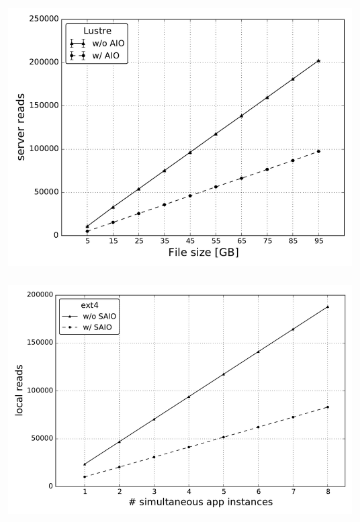 \begin{figure}[!htb]
\begin{subfigure}[t]{0.32\textwidth}
    \centering
    \includegraphics[width=\textwidth]{figures/SC2015/ROOT/separate_plots/test_cluster/Lustre/server_reads}
    \caption{\textit{}}
    \label{figure: lustre_3}
  \end{subfigure}
  \begin{subfigure}[b]{0.32\textwidth}
    \centering
    \includegraphics[width=\textwidth]{figures/SC2015/ROOT/cluster/multiple_instances/reads_simult_instance_ext4_test_cluster}
    \caption{\textit{}}
    \label{figure: ext4_4}
  \end{subfigure}
  \begin{subfigure}[b]{0.32\textwidth}
    \centering

\end{subfigure}
\end{figure}
